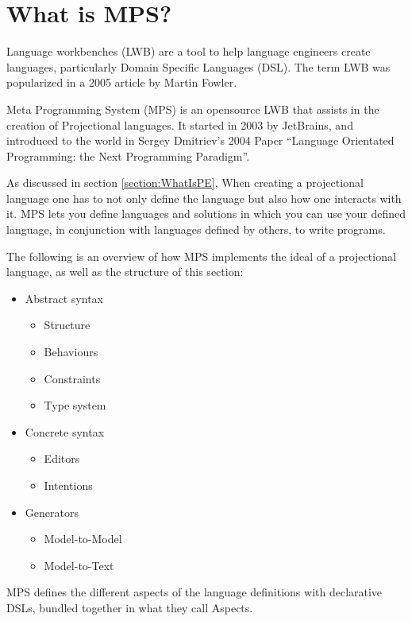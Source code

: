 \section{What is MPS?}

Language workbenches (LWB) are a tool to help language engineers create languages, particularly Domain Specific Languages (DSL).  
The term LWB was popularized in a 2005 article by Martin Fowler\cite{Fowler_lwb}.  

Meta Programming System (MPS) is an opensource LWB that assists in the creation of Projectional languages.
It started in 2003 by JetBrains, and introduced to the world in Sergey Dmitriev's 2004 Paper ``Language Orientated Programming: the Next Programming Paradigm''\cite{dmitriev2004language}.

As discussed in section \ref{section:WhatIsPE}, When creating a projectional language one has to not only define the language but also how one interacts with it.
MPS lets you define languages and solutions in which you can use your defined language, in conjunction with languages defined by others, to write programs.

The following is an overview of how MPS implements the ideal of a projectional language, as well as the structure of this section: 

\begin{itemize}
    \item Abstract syntax
    \begin{itemize}
        \item Structure
        \item Behaviours
        \item Constraints
        \item Type system
    \end{itemize}
    \item Concrete syntax
    \begin{itemize}
        \item Editors
        \item Intentions
    \end{itemize}
    \item Generators
    \begin{itemize}
        \item Model-to-Model
        \item Model-to-Text
    \end{itemize}
\end{itemize}

MPS defines the different aspects of the language definitions with declarative DSLs, bundled together in what they call Aspects. 

